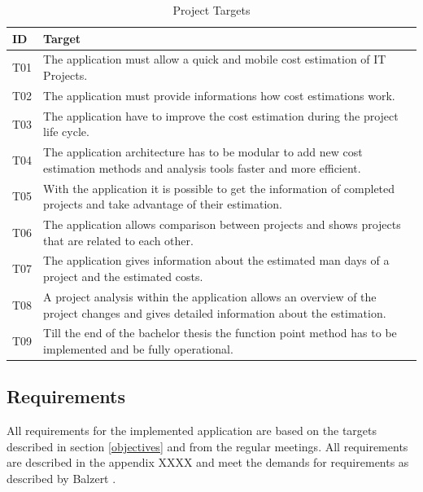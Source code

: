 \begin{table}[h]
	\centering 
	\setlength{\tabcolsep}{4pt}
	\begin{tabular}{|l||p{14cm}|}\hline
		ID		& Target\\ \hline\hline
		T01  	& The application must allow a quick and mobile cost estimation of IT Projects.\\ \hline
		T02  	& The application must provide informations how cost estimations work.\\ \hline
		T03  	& The application have to improve the cost estimation during  the project life cycle.\\ \hline
		T04  	& The application architecture has to be modular to add new cost estimation methods and analysis tools faster and more efficient.\\ \hline
		T05  	& With the application it is possible to get the information of completed projects and take advantage of their estimation.\\ \hline
		T06  	& The application allows comparison between projects and shows projects that are related to each other.\\ \hline
		T07  	& The application gives information about the estimated man days of a project and the estimated costs.\\ \hline
		T08  	& A project analysis within the application allows an overview of the project changes and gives detailed information about the estimation.\\ \hline
		T09  	& Till the end of the bachelor thesis the function point method has to be implemented and be fully operational.\\ \hline
	\end{tabular} 
	\caption{Project Targets} 
	\label{projecttargets} 
\end{table}

\subsection{Requirements}\label{requirements}

All requirements for the implemented application are based on the targets described in section \ref{objectives} and from the regular meetings. All requirements are described in the appendix XXXX and meet the demands for requirements as described by Balzert \cite{basiskonzepteRE}.\\



